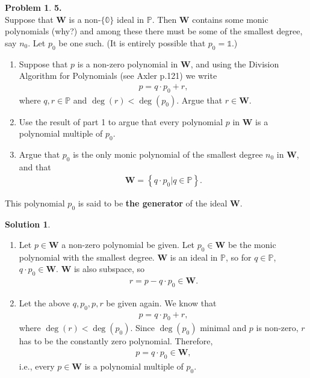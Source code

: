 \documentclass{book}
\theoremstyle{definition}
\newtheorem*{prob*}{Problem}
\newtheorem*{sln*}{Solution}
\newcommand{\W}{\mathbf{W}}
\begin{document}
\begin{prob*}\textbf{5.}\\
	
	Suppose that $\W$ is a non-$\{\mathbb{0}\}$ ideal in $\mathbb{P}$. Then $\W$ contains some monic polynomials (why?) and among these there must be some of the smallest degree, say $n_0$. Let $p_0$ be one such. (It is entirely possible that $p_0 = \mathbb{1}$.)
	\begin{enumerate}
		\item Suppose that $p$ is a non-zero polynomial in $\W$, and using the Division Algorithm for Polynomials (see Axler p.121) we write
		\begin{align*}
		p = q \cdot p_0+ r,
		\end{align*}
		where $q,r \in \mathbb{P}$ and $\deg(r) < \deg(p_0)$. Argue that $r\in \W$.
		\item Use the result of part 1 to argue that every polynomial $p$ in $\W$ is a polynomial multiple of $p_0$.
		\item Argue that $p_0$ is the only monic polynomial of the smallest degree $n_0$ in $\W$, and that
		\begin{align*}
		\W= \left\{ q\cdot p_0 \big\vert q \in \mathbb{P} \right\}.
		\end{align*}
	\end{enumerate}
This polynomial $p_0$ is said to be \textbf{the generator} of the ideal $\W$.

\begin{sln*}
	$\,$
	\begin{enumerate}
		\item Let $p \in \W$ a non-zero polynomial be given. Let $p_0 \in \W$ be the monic polynomial with the smallest degree. $\W$ is an ideal in $\mathbb{P}$, so for $q \in \mathbb{P}$, $q \cdot p_0 \in \W$. $\W$ is also subspace, so
		\begin{align*}
		r = p - q \cdot p_0 \in \W.
		\end{align*}
		
		\item Let the above $q,p_0,p, r$ be given again. We know that
		\begin{align*}
		p = q\cdot p_0 + r,
		\end{align*}  
		where $\deg(r) < \deg(p_0)$. Since $\deg(p_0)$ minimal and $p$ is non-zero, $r$ has to be the constantly zero polynomial. Therefore,
		\begin{align*}
		p = q\cdot p_0 \in \W,
		\end{align*} 
		i.e., every $p\in \W$ is a polynomial multiple of $p_0$.\\
		

\end{enumerate}
\end{sln*}
\end{prob*}
\end{document}
